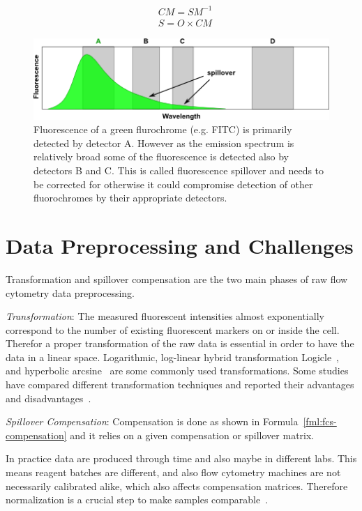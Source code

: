 \begin{align}
  &CM = SM^{-1} \nonumber \\
  &S = O \times CM
  \label{fml:fcs-compensation}
\end{align}

\begin{figure}[!ht]
  \centering
  \includegraphics[width=.8\textwidth]{figs/FITC_spillover_onLSRII_s}
  \caption[Flow Cytometry Spillover Effect]{Fluorescence of a green flurochrome (e.g. FITC) is primarily detected by detector A. However as the emission spectrum is relatively broad some of the fluorescence is detected also by detectors B and C. This is called fluorescence spillover and needs to be corrected for otherwise it could compromise detection of other fluorochromes by their appropriate detectors\footnotemark[1].}
  \label{fig:flow-cytometry-spillover}
\end{figure}

\section{Data Preprocessing and Challenges}
Transformation and spillover compensation are the two main phases of raw flow cytometry data preprocessing.

\emph{Transformation}: The measured fluorescent intensities almost exponentially correspond to the number of existing fluorescent markers on or inside the cell. Therefor a proper transformation of the raw data is essential in order to have the data in a linear space. Logarithmic, log-linear hybrid transformation Logicle~\cite{fcs-logicle}, and hyperbolic arcsine~\cite{fcs-arcsineh} are some commonly used transformations. Some studies have compared different transformation techniques and reported their advantages and disadvantages~\cite{fcs-transformation-survey1, fcs-transformation-survey2}.

\emph{Spillover Compensation}: Compensation is done as shown in Formula~\ref{fml:fcs-compensation} and it relies on a given compensation or spillover matrix.

In practice data are produced through time and also maybe in different labs. This means reagent batches are different, and also flow cytometry machines are not necessarily calibrated alike, which also affects compensation matrices. Therefore normalization is a crucial step to make samples comparable~\cite{fcs-normalization}.

